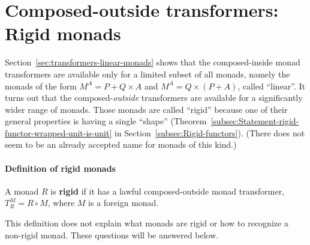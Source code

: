 \section{Composed-outside transformers: Rigid monads\label{sec:transformers-rigid-monads}}

Section~\ref{sec:transformers-linear-monads} shows that the composed-inside
monad transformers are available only for a limited subset of all
monads, namely the monads of the form $M^{A}=P+Q\times A$
and $M^{A}=Q\times\left(P+A\right)$, called ``linear''. It turns
out that the composed-\emph{outside} transformers are available for
a significantly wider range of monads. Those monads are called ``rigid''
because one of their general properties is having a single ``shape''
(Theorem~\ref{subsec:Statement-rigid-functor-wrapped-unit-is-unit}
in Section~\ref{subsec:Rigid-functors}). (There
does not seem to be an already accepted name for monads of this kind.)

\paragraph{Definition of rigid monads}

A monad $R$ is \textbf{rigid} if it has a lawful composed-outside
monad transformer, $T_{R}^{M}=R\circ M$, where $M$ is a foreign
monad. 

This definition does not explain what monads are rigid or how to recognize
a non-rigid monad. These questions will be answered below.

